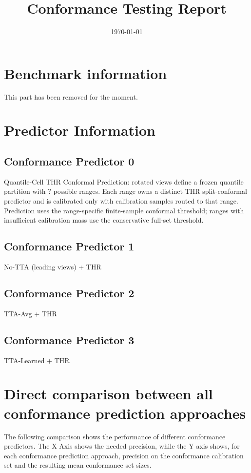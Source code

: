 \documentclass[parskip=half]{scrartcl}
\title{Conformance Testing Report}
\author{\relax}\date{\today}
\begin{document}
 \maketitle
        \section{Benchmark information}This part has been removed for the moment.\section{{Predictor Information}}\subsection{Conformance Predictor 0 }Quantile-Cell THR Conformal Prediction: rotated views define a frozen quantile partition with ? possible ranges. Each range owns a distinct THR split-conformal predictor and is calibrated only with calibration samples routed to that range. Prediction uses the range-specific finite-sample conformal threshold; ranges with insufficient calibration mass use the conservative full-set threshold.\subsection{Conformance Predictor 1 }No-TTA (leading views) + THR\subsection{Conformance Predictor 2 }TTA-Avg + THR\subsection{Conformance Predictor 3 }TTA-Learned + THR\section{Direct comparison between all conformance prediction approaches}
The following comparison shows the performance of different conformance predictors. The X Axis shows the needed precision, while the Y axis shows, for each conformance prediction approach, precision on the conformance calibration set and the resulting mean conformance set sizes.
\end{document}
